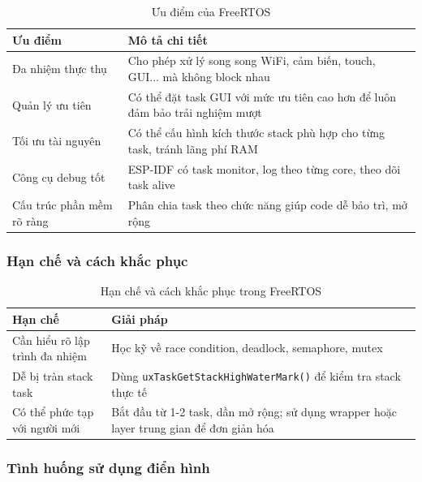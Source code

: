 \begin{table}[H]
  \centering
  \begin{tabular}{|l|p{10cm}|}
  \hline
  \textbf{Ưu điểm} & \textbf{Mô tả chi tiết} \\
  \hline
  Đa nhiệm thực thụ & Cho phép xử lý song song WiFi, cảm biến, touch, GUI... mà không block nhau \\
  Quản lý ưu tiên & Có thể đặt task GUI với mức ưu tiên cao hơn để luôn đảm bảo trải nghiệm mượt \\
  Tối ưu tài nguyên & Có thể cấu hình kích thước stack phù hợp cho từng task, tránh lãng phí RAM \\
  Công cụ debug tốt & ESP-IDF có task monitor, log theo từng core, theo dõi task alive \\
  Cấu trúc phần mềm rõ ràng & Phân chia task theo chức năng giúp code dễ bảo trì, mở rộng \\
  \hline
  \end{tabular}
  \caption{Ưu điểm của FreeRTOS}
\end{table}

\subsubsection{Hạn chế và cách khắc phục}

\begin{table}[H]
  \centering
  \begin{tabular}{|l|p{10cm}|}
  \hline
  \textbf{Hạn chế} & \textbf{Giải pháp} \\
  \hline
  Cần hiểu rõ lập trình đa nhiệm & Học kỹ về race condition, deadlock, semaphore, mutex \\
  Dễ bị tràn stack task & Dùng \texttt{uxTaskGetStackHighWaterMark()} để kiểm tra stack thực tế \\
  Có thể phức tạp với người mới & Bắt đầu từ 1-2 task, dần mở rộng; sử dụng wrapper hoặc layer trung gian để đơn giản hóa \\
  \hline
  \end{tabular}
  \caption{Hạn chế và cách khắc phục trong FreeRTOS}
\end{table}

\subsubsection{Tình huống sử dụng điển hình}

